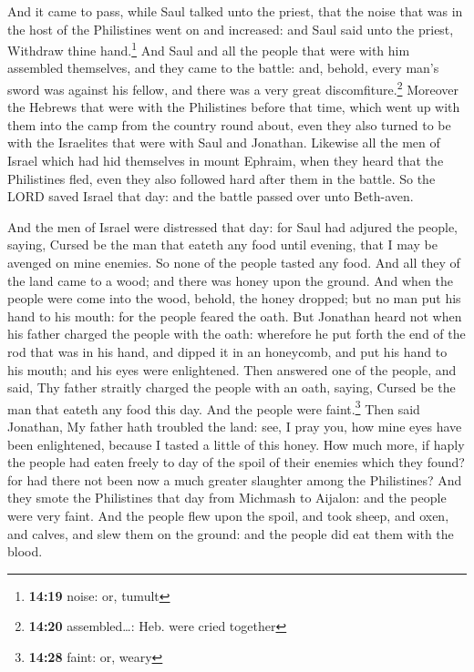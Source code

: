  And it came to pass, while Saul talked unto the priest,
that the noise that was in the host of the Philistines went on and
increased: and Saul said unto the priest, Withdraw thine
hand.\footnote{\textbf{14:19} noise: or, tumult}  And
Saul and all the people that were with him assembled themselves, and
they came to the battle: and, behold, every man's sword was against his
fellow, and there was a very great discomfiture.\footnote{\textbf{14:20}
  assembled\ldots: Heb. were cried together}  Moreover
the Hebrews that were with the Philistines before that time, which went
up with them into the camp from the country round about, even they also
turned to be with the Israelites that were with Saul and Jonathan.
 Likewise all the men of Israel which had hid themselves
in mount Ephraim, when they heard that the Philistines fled, even they
also followed hard after them in the battle.  So the LORD
saved Israel that day: and the battle passed over unto Beth-aven.

 And the men of Israel were distressed that day: for Saul
had adjured the people, saying, Cursed be the man that eateth any food
until evening, that I may be avenged on mine enemies. So none of the
people tasted any food.  And all they of the land came to
a wood; and there was honey upon the ground.  And when
the people were come into the wood, behold, the honey dropped; but no
man put his hand to his mouth: for the people feared the oath.
 But Jonathan heard not when his father charged the
people with the oath: wherefore he put forth the end of the rod that was
in his hand, and dipped it in an honeycomb, and put his hand to his
mouth; and his eyes were enlightened.  Then answered one
of the people, and said, Thy father straitly charged the people with an
oath, saying, Cursed be the man that eateth any food this day. And the
people were faint.\footnote{\textbf{14:28} faint: or, weary}
 Then said Jonathan, My father hath troubled the land:
see, I pray you, how mine eyes have been enlightened, because I tasted a
little of this honey.  How much more, if haply the people
had eaten freely to day of the spoil of their enemies which they found?
for had there not been now a much greater slaughter among the
Philistines?  And they smote the Philistines that day
from Michmash to Aijalon: and the people were very faint.
 And the people flew upon the spoil, and took sheep, and
oxen, and calves, and slew them on the ground: and the people did eat
them with the blood.

